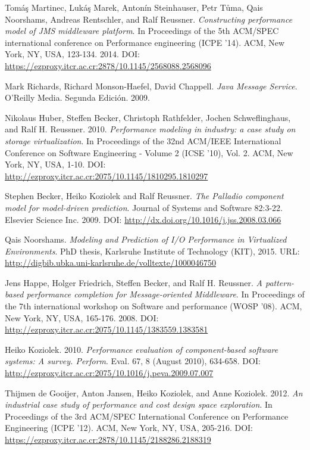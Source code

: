 \documentclass[11pt, twoside]{report}
\begin{document}
\begin{thebibliography}{9}
 Tomáş Martinec, Lukáş Marek, Antonín Steinhauser, Petr Tůma, Qais Noorshams, Andreas Rentschler, and Ralf Reussner. \emph{Constructing performance model of JMS middleware platform}. In Proceedings of the 5th ACM/SPEC international conference on Performance engineering (ICPE '14). ACM, New York, NY, USA, 123-134. 2014. DOI: \url{https://ezproxy.itcr.ac.cr:2878/10.1145/2568088.2568096}

 Mark Richards, Richard Monson-Haefel, David Chappell. \emph{Java Message Service}. O'Reilly Media. Segunda Edición. 2009.

 Nikolaus Huber, Steffen Becker, Christoph Rathfelder, Jochen Schweflinghaus, and Ralf H. Reussner. 2010. \emph{Performance modeling in industry: a case study on storage virtualization}. In Proceedings of the 32nd ACM/IEEE International Conference on Software Engineering - Volume 2 (ICSE '10), Vol. 2. ACM, New York, NY, USA, 1-10. DOI: \url{http://ezproxy.itcr.ac.cr:2075/10.1145/1810295.1810297} 

 Stephen Becker, Heiko Koziolek and Ralf Reussner. \emph{The Palladio component model for model-driven prediction}. Journal of Systems and Software 82:3-22. Elsevier Science Inc. 2009. DOI: \url{http://dx.doi.org/10.1016/j.jss.2008.03.066}

 Qais Noorshams. \emph{Modeling and Prediction of I/O Performance in Virtualized Environments}. PhD thesis, Karlsruhe Institute of Technology (KIT), 2015. URL: \url{http://digbib.ubka.uni-karlsruhe.de/volltexte/1000046750}


 Jens Happe, Holger Friedrich, Steffen Becker, and Ralf H. Reussner. \emph{A pattern-based performance completion for Message-oriented Middleware}. In Proceedings of the 7th international workshop on Software and performance (WOSP '08). ACM, New York, NY, USA, 165-176. 2008. DOI: \url{http://ezproxy.itcr.ac.cr:2075/10.1145/1383559.1383581} 


 Heiko Koziolek. 2010. \emph{Performance evaluation of component-based software systems: A survey. Perform}. Eval. 67, 8 (August 2010), 634-658. DOI: \url{http://ezproxy.itcr.ac.cr:2075/10.1016/j.peva.2009.07.007} 

 Thijmen de Gooijer, Anton Jansen, Heiko Koziolek, and Anne Koziolek. 2012. \emph{An industrial case study of performance and cost design space exploration}. In Proceedings of the 3rd ACM/SPEC International Conference on Performance Engineering (ICPE '12). ACM, New York, NY, USA, 205-216. DOI: \url{https://ezproxy.itcr.ac.cr:2878/10.1145/2188286.2188319}


\end{thebibliography}
\end{document}
